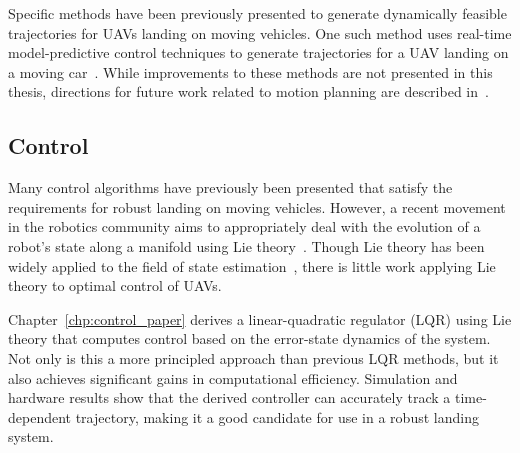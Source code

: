 Specific methods have been previously
presented to generate dynamically feasible trajectories for UAVs landing on moving
vehicles. One such method uses real-time model-predictive control techniques to
generate trajectories for a UAV landing on a moving car~\cite{baca2019autonomous}.
While improvements to these methods are not presented in this thesis, 
directions for future work related to motion planning are described
in~.

\subsection{Control}
Many control algorithms have previously been presented that satisfy the
requirements for robust landing on moving vehicles.
However, a recent
movement in the robotics community aims to appropriately deal with the evolution of a
robot's state along a manifold using Lie theory~\cite{sola2018micro}. Though
Lie theory has been widely applied to the field of state
estimation~\cite{sola2017quaternion, koch2017relative}, there is little 
work applying Lie theory to optimal control of UAVs.

Chapter~\ref{chp:control_paper} derives a
linear-quadratic regulator (LQR) using Lie theory that computes control based on
the error-state dynamics of the system. Not only is this a more principled
approach than previous LQR methods, but it also achieves significant gains in computational efficiency.
Simulation and hardware results show that the derived controller can accurately
track a time-dependent trajectory, making it a good candidate for use in a
robust landing system.

